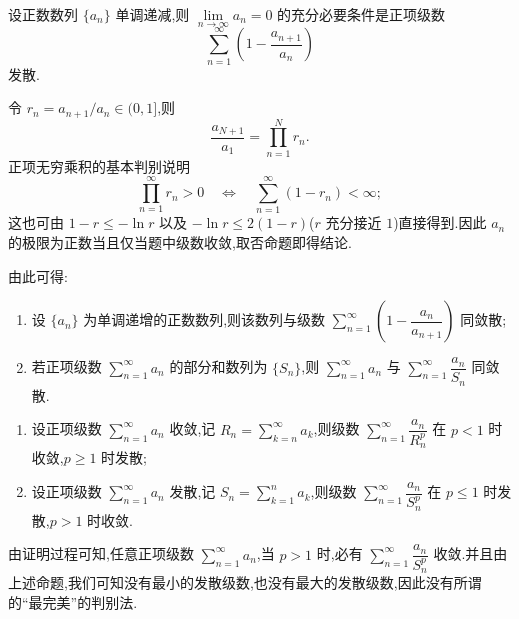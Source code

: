 \begin{example}
    设正数数列 $\{a_n\}$ 单调递减,则 $\displaystyle\lim\limits_{n\to\infty}a_n=0$ 的充分必要条件是正项级数
    \[
        \displaystyle\sum\limits_{n=1}^{\infty}\left(1-\dfrac{a_{n+1}}{a_n}\right)
    \]
    发散.
\end{example}
\exampleblank

\begin{solution}
    令 $r_n=a_{n+1}/a_n\in(0,1]$,则
    \[
        \dfrac{a_{N+1}}{a_1}=\prod\limits_{n=1}^{N}r_n.
    \]
    正项无穷乘积的基本判别说明
    \[
        \displaystyle\prod\limits_{n=1}^{\infty}r_n>0
        \quad\Longleftrightarrow\quad
        \sum\limits_{n=1}^{\infty}(1-r_n)<\infty;
    \]
    这也可由 $1-r\leq-\ln r$ 以及 $-\ln r\leq2(1-r)$($r$ 充分接近 $1$)直接得到.因此 $a_n$ 的极限为正数当且仅当题中级数收敛,取否命题即得结论.
\end{solution}

\begin{remark}
    由此可得:
    \begin{enumerate}
        \item 设 $\{a_n\}$ 为单调递增的正数数列,则该数列与级数 $\displaystyle\sum\limits_{n=1}^{\infty}\left(1-\dfrac{a_n}{a_{n+1}}\right)$ 同敛散;
        \item 若正项级数 $\displaystyle\sum\limits_{n=1}^{\infty}a_n$ 的部分和数列为 $\{S_n\}$,则 $\displaystyle\sum\limits_{n=1}^{\infty}a_n$ 与 $\displaystyle\sum\limits_{n=1}^{\infty}\dfrac{a_n}{S_n}$ 同敛散.
    \end{enumerate}
\end{remark}

\begin{proposition}[\markstar]
    \leavevmode
    \begin{enumerate}
        \item 设正项级数 $\displaystyle\sum\limits_{n=1}^{\infty}a_n$ 收敛,记 $\displaystyle R_n=\sum\limits_{k=n}^{\infty}a_k$,则级数 $\displaystyle\sum\limits_{n=1}^{\infty}\dfrac{a_n}{R_n^p}$ 在 $p<1$ 时收敛,$p\geq1$ 时发散;
        \item 设正项级数 $\displaystyle\sum\limits_{n=1}^{\infty}a_n$ 发散,记 $\displaystyle S_n=\sum\limits_{k=1}^na_k$,则级数 $\displaystyle\sum\limits_{n=1}^{\infty}\dfrac{a_n}{S_n^p}$ 在 $p\leq1$ 时发散,$p>1$ 时收敛.
    \end{enumerate}
\end{proposition}

\begin{remark}
    由证明过程可知,任意正项级数 $\displaystyle\sum\limits_{n=1}^{\infty}a_n$,当 $p>1$ 时,必有 $\displaystyle\sum\limits_{n=1}^{\infty}\dfrac{a_n}{S_n^p}$ 收敛.并且由上述命题,我们可知没有最小的发散级数,也没有最大的发散级数,因此没有所谓的``最完美''的判别法.
\end{remark}

